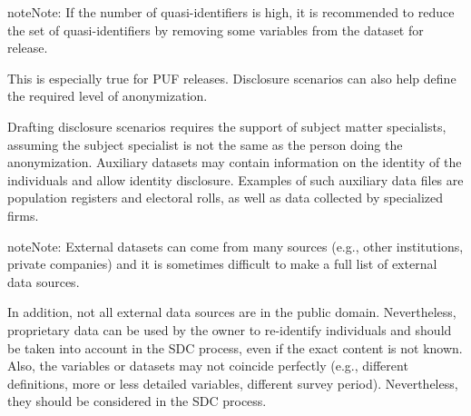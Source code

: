\documentclass[letterpaper,10pt,english]{sphinxmanual}
\begin{document}
\begin{sphinxadmonition}{note}{Note:}
If the number of quasi-identifiers is high, it is recommended to reduce the set
of quasi-identifiers by removing some variables from the dataset for
release.
\end{sphinxadmonition}

This is especially true for PUF releases. Disclosure
scenarios can also help define the required level of anonymization.

Drafting disclosure scenarios requires the support of subject matter
specialists, assuming the subject specialist is not the same as the
person doing the anonymization. Auxiliary datasets may contain
information on the identity of the individuals and allow identity
disclosure. Examples of such auxiliary data files are population
registers and electoral rolls, as well as data collected by specialized
firms.

\begin{sphinxadmonition}{note}{Note:}
External datasets can come from many sources (e.g., other
institutions, private companies) and it is sometimes difficult to make a
full list of external data sources.
\end{sphinxadmonition}

In addition, not all external data
sources are in the public domain. Nevertheless, proprietary data can be
used by the owner to re-identify individuals and should be taken into
account in the SDC process, even if the exact content is not known.
Also, the variables or datasets may not coincide perfectly (e.g.,
different definitions, more or less detailed variables, different survey
period). Nevertheless, they should be considered in the SDC process.
\end{document}
